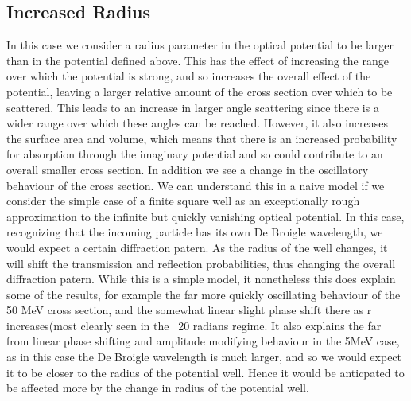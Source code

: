 \documentclass[paper=a4, fontsize=11pt]{scrartcl} %
\numberwithin{equation}{section} %
\numberwithin{figure}{section} %
\numberwithin{table}{section} %
\begin{document}
\subsection{Increased Radius}

In this case we consider a radius parameter in the optical potential to be larger than in the potential defined above. This has the effect of increasing the range over which the potential is strong, and so increases the overall effect of the potential, leaving a larger relative amount of the cross section over which to be scattered. This leads to an increase in larger angle scattering since there is a wider range over which these angles can be reached. However, it also increases the surface area and volume, which means that there is an increased probability for absorption through the imaginary potential and so could contribute to an overall smaller cross section. In addition we see a change in the oscillatory behaviour of the cross section. We can understand this in a naive model if we consider the simple case of a finite square well as an exceptionally rough approximation to the infinite but quickly vanishing optical potential. In this case, recognizing that the incoming particle has its own De Broigle wavelength, we would expect a certain diffraction patern. As the radius of the well changes, it will shift the transmission and reflection probabilities, thus changing the overall diffraction patern. While this is a simple model, it nonetheless this does explain some of the results, for example the far more quickly oscillating behaviour of the 50 MeV cross section, and the somewhat linear slight phase shift there as r increases(most clearly seen in  the ~20 radians regime. It also explains the far from linear phase shifting and amplitude modifying behaviour in the 5MeV case, as in this case the De Broigle wavelength is much larger, and so we would expect it to be closer to the radius of the potential well. Hence it  would be anticpated to be affected more by the change in radius of the potential well. 
\end{document}
